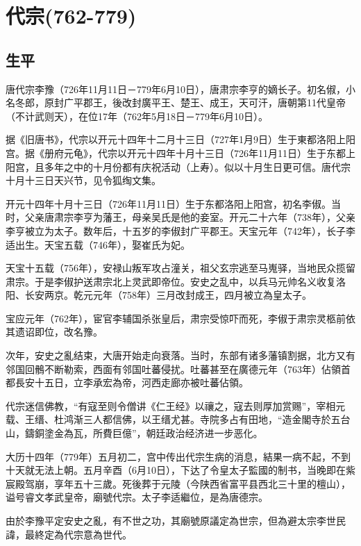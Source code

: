 
\section{代宗\tiny(762-779)}

\subsection{生平}

唐代宗李豫（726年11月11日－779年6月10日），唐肃宗李亨的嫡长子。初名俶，小名冬郎，原封广平郡王，後改封廣平王、楚王、成王，天可汗，唐朝第11代皇帝（不计武则天），在位17年（762年5月18日－779年6月10日）。

据《旧唐书》，代宗以开元十四年十二月十三日（727年1月9日）生于東都洛阳上阳宫。据《册府元龟》，代宗以开元十四年十月十三日（726年11月11日）生于东都上阳宫，且多年之中的十月份都有庆祝活动（上寿）。似以十月生日更可信。唐代宗十月十三日天兴节，见令狐绹文集。

开元十四年十月十三日（726年11月11日）生于东都洛阳上阳宫，初名李俶。当时，父亲唐肃宗李亨为藩王，母亲吴氏是他的妾室。开元二十六年（738年），父亲李亨被立为太子。数年后，十五岁的李俶封广平郡王。天宝元年（742年），长子李适出生。天宝五载（746年），娶崔氏为妃。

天宝十五载（756年），安禄山叛军攻占潼关，祖父玄宗逃至马嵬驿，当地民众揽留肃宗。于是李俶护送肃宗北上灵武即帝位。安史之乱中，以兵马元帅名义收复洛阳、长安两京。乾元元年（758年）三月改封成王，四月被立為皇太子。

宝应元年（762年），宦官李辅国杀张皇后，肃宗受惊吓而死，李俶于肃宗灵柩前依其遗诏即位，改名豫。

次年，安史之亂结束，大唐开始走向衰落。当时，东部有诸多藩镇割据，北方又有邻国回鶻不断勒索，西面有邻国吐蕃侵扰。吐蕃甚至在廣德元年（763年）佔領首都長安十五日，立李承宏為帝，河西走廊亦被吐蕃佔領。

代宗迷信佛教，“有寇至则令僧讲《仁王经》以禳之，寇去则厚加赏赐”，宰相元载、王缙、杜鸿渐三人都信佛，以王缙尤甚。寺院多占有田地，“造金閣寺於五台山，鑄銅塗金為瓦，所費巨億”，朝廷政治经济进一步恶化。

大历十四年（779年）五月初二，宫中传出代宗生病的消息，結果一病不起，不到十天就无法上朝。五月辛酉（6月10日），下达了令皇太子監國的制书，当晚即在紫宸殿驾崩，享年五十三歲。死後葬于元陵（今陕西省富平县西北三十里的檀山），谥号睿文孝武皇帝，廟號代宗。太子李适繼位，是為唐德宗。

由於李豫平定安史之亂，有不世之功，其廟號原議定為世宗，但為避太宗李世民諱，最終定為代宗意為世代。

